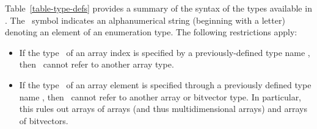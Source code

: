 {Table~\ref{table-type-defs} provides a summary of the syntax of the
types available in \mocha.  The \element\ symbol indicates an
alphanumerical string (beginning with a letter) denoting an element of
an enumeration type. The following restrictions apply:
%
\begin{itemize}

\item 
If the type \indextype\ of an array index is specified by a
previously-defined type name \typename, then \typename\ cannot refer
to another array type.  

\item 
If the type \elementtype\ of an array element is specified through a
previously defined type name \typename, then \typename\ cannot refer
to another array or bitvector type.  In particular, this rules out
arrays of arrays (and thus
multidimensional arrays) and arrays of bitvectors. 

\end{itemize}

}
